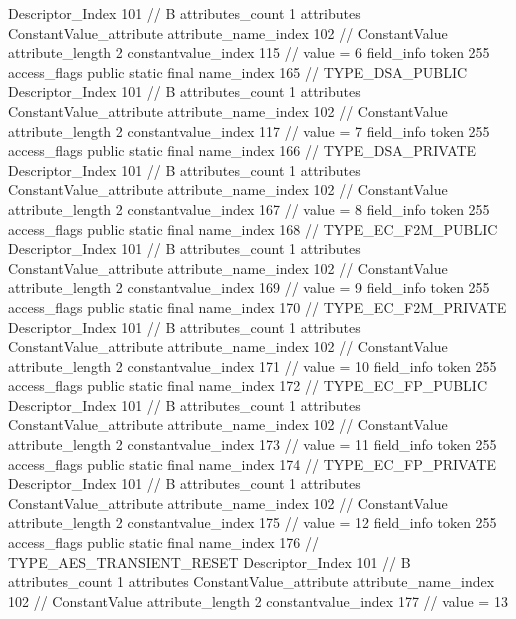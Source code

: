 {{{{{				Descriptor_Index	101		// B
				attributes_count	1
				attributes {
				ConstantValue_attribute {
					attribute_name_index	102		// ConstantValue
					attribute_length	2
					constantvalue_index	115		// value = 6
				}
				}
			}
			field_info {
				token	255
				access_flags	public static final
				name_index	165		// TYPE_DSA_PUBLIC
				Descriptor_Index	101		// B
				attributes_count	1
				attributes {
				ConstantValue_attribute {
					attribute_name_index	102		// ConstantValue
					attribute_length	2
					constantvalue_index	117		// value = 7
				}
				}
			}
			field_info {
				token	255
				access_flags	public static final
				name_index	166		// TYPE_DSA_PRIVATE
				Descriptor_Index	101		// B
				attributes_count	1
				attributes {
				ConstantValue_attribute {
					attribute_name_index	102		// ConstantValue
					attribute_length	2
					constantvalue_index	167		// value = 8
				}
				}
			}
			field_info {
				token	255
				access_flags	public static final
				name_index	168		// TYPE_EC_F2M_PUBLIC
				Descriptor_Index	101		// B
				attributes_count	1
				attributes {
				ConstantValue_attribute {
					attribute_name_index	102		// ConstantValue
					attribute_length	2
					constantvalue_index	169		// value = 9
				}
				}
			}
			field_info {
				token	255
				access_flags	public static final
				name_index	170		// TYPE_EC_F2M_PRIVATE
				Descriptor_Index	101		// B
				attributes_count	1
				attributes {
				ConstantValue_attribute {
					attribute_name_index	102		// ConstantValue
					attribute_length	2
					constantvalue_index	171		// value = 10
				}
				}
			}
			field_info {
				token	255
				access_flags	public static final
				name_index	172		// TYPE_EC_FP_PUBLIC
				Descriptor_Index	101		// B
				attributes_count	1
				attributes {
				ConstantValue_attribute {
					attribute_name_index	102		// ConstantValue
					attribute_length	2
					constantvalue_index	173		// value = 11
				}
				}
			}
			field_info {
				token	255
				access_flags	public static final
				name_index	174		// TYPE_EC_FP_PRIVATE
				Descriptor_Index	101		// B
				attributes_count	1
				attributes {
				ConstantValue_attribute {
					attribute_name_index	102		// ConstantValue
					attribute_length	2
					constantvalue_index	175		// value = 12
				}
				}
			}
			field_info {
				token	255
				access_flags	public static final
				name_index	176		// TYPE_AES_TRANSIENT_RESET
				Descriptor_Index	101		// B
				attributes_count	1
				attributes {
				ConstantValue_attribute {
					attribute_name_index	102		// ConstantValue
					attribute_length	2
					constantvalue_index	177		// value = 13
}}}}}}}
